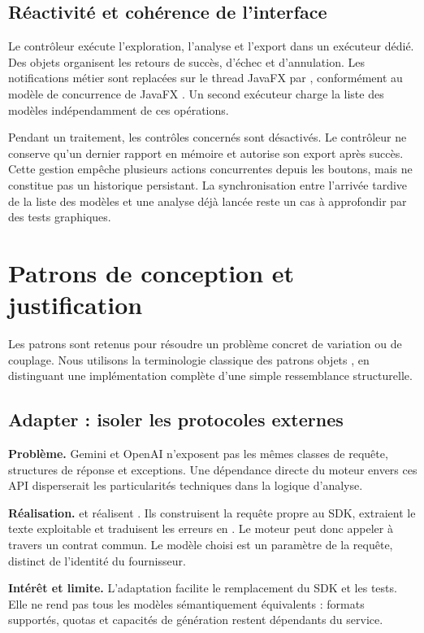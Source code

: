 \subsection{Réactivité et cohérence de l'interface}
Le contrôleur exécute l'exploration, l'analyse et l'export dans un exécuteur dédié. Des objets  organisent les retours de succès, d'échec et d'annulation. Les notifications métier sont replacées sur le thread JavaFX par , conformément au modèle de concurrence de JavaFX \cite{javafx}. Un second exécuteur charge la liste des modèles indépendamment de ces opérations.

Pendant un traitement, les contrôles concernés sont désactivés. Le contrôleur ne conserve qu'un dernier rapport en mémoire et autorise son export après succès. Cette gestion empêche plusieurs actions concurrentes depuis les boutons, mais ne constitue pas un historique persistant. La synchronisation entre l'arrivée tardive de la liste des modèles et une analyse déjà lancée reste un cas à approfondir par des tests graphiques.

\clearpage
\section{Patrons de conception et justification}
\label{sec:patterns}
Les patrons sont retenus pour résoudre un problème concret de variation ou de couplage. Nous utilisons la terminologie classique des patrons objets \cite{gof}, en distinguant une implémentation complète d'une simple ressemblance structurelle.

\subsection{Adapter : isoler les protocoles externes}
\textbf{Problème.} Gemini et OpenAI n'exposent pas les mêmes classes de requête, structures de réponse et exceptions. Une dépendance directe du moteur envers ces API disperserait les particularités techniques dans la logique d'analyse.

\textbf{Réalisation.}  et  réalisent . Ils construisent la requête propre au SDK, extraient le texte exploitable et traduisent les erreurs en . Le moteur peut donc appeler  à travers un contrat commun. Le modèle choisi est un paramètre de la requête, distinct de l'identité du fournisseur.

\textbf{Intérêt et limite.} L'adaptation facilite le remplacement du SDK et les tests. Elle ne rend pas tous les modèles sémantiquement équivalents : formats supportés, quotas et capacités de génération restent dépendants du service.

